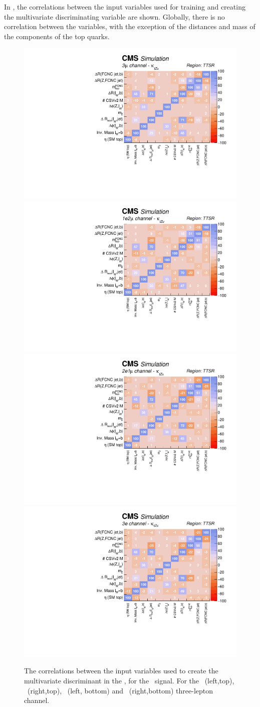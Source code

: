 \newpage
In , the correlations between the input variables used for training and creating the multivariate discriminating variable are shown. Globally, there is no correlation between the variables, with the exception of the distances and mass of the components of the top quarks. 
\begin{figure}[htbp]
	\centering
	\includegraphics[width=0.49\linewidth]{6_Search/Figures/PlotsTechnics/correlationsigZuttoppairuuu}
	\includegraphics[width=0.49\linewidth]{6_Search/Figures/PlotsTechnics/correlationsigZuttoppairuue}
	\includegraphics[width=0.49\linewidth]{6_Search/Figures/PlotsTechnics/correlationsigZuttoppaireeu}
	\includegraphics[width=0.49\linewidth]{6_Search/Figures/PlotsTechnics/correlationsigZuttoppaireee}
	\caption{The correlations between the input variables used to create the multivariate discriminant in the \TTSR, for the \Zut\ signal. For the \mumumu\ (left,top), \emumu\ (right,top), \eemu\ (left, bottom) and \eee\ (right,bottom) three-lepton channel.}
	\label{fig:correlationsigzuttoppair}
\end{figure}


